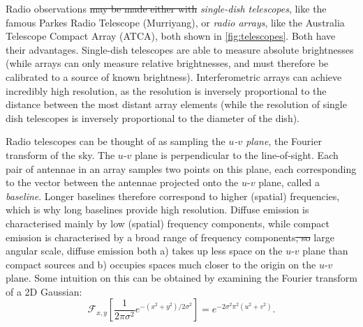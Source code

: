 \documentclass[11pt, a4paper]{book}
\newcommand{\defn}[1]{\emph{#1}}
\providecommand{\DIFaddtex}[1]{{\protect\color{blue}\uwave{#1}}} %
\providecommand{\DIFdeltex}[1]{{\protect\color{red}\sout{#1}}}                      %
\providecommand{\DIFaddbegin}{} %
\providecommand{\DIFaddend}{} %
\providecommand{\DIFdelbegin}{} %
\providecommand{\DIFdelend}{} %
\providecommand{\DIFadd}[1]{\texorpdfstring{\DIFaddtex{#1}}{#1}} %
\providecommand{\DIFdel}[1]{\texorpdfstring{\DIFdeltex{#1}}{}} %
\newcommand{\DIFscaledelfig}{0.5}
\newlength{\DIFdelgraphicswidth} %
\newlength{\DIFdelgraphicsheight} %
\newcommand{\DIFaddincludegraphics}[2][]{{\color{blue}\fbox{\DIFOincludegraphics[#1]{#2}}}} %
\newcommand{\DIFdelincludegraphics}[2][]{%
\sbox{\DIFdelgraphicsbox}{\DIFOincludegraphics[#1]{#2}}%
\settoboxwidth{\DIFdelgraphicswidth}{\DIFdelgraphicsbox} %
\settoboxtotalheight{\DIFdelgraphicsheight}{\DIFdelgraphicsbox} %
\scalebox{\DIFscaledelfig}{%
\parbox[b]{\DIFdelgraphicswidth}{\usebox{\DIFdelgraphicsbox}\\[-\baselineskip] \rule{\DIFdelgraphicswidth}{0em}}\llap{\resizebox{\DIFdelgraphicswidth}{\DIFdelgraphicsheight}{%
\setlength{\unitlength}{\DIFdelgraphicswidth}%
\begin{picture}(1,1)%
\thicklines\linethickness{2pt} %
{\color[rgb]{1,0,0}\put(0,0){\framebox(1,1){}}}%
{\color[rgb]{1,0,0}\put(0,0){\line( 1,1){1}}}%
{\color[rgb]{1,0,0}\put(0,1){\line(1,-1){1}}}%
\end{picture}%
}\hspace*{3pt}}} %
} %
\DeclareRobustCommand{\DIFaddbegin}{\DIFOaddbegin \let\includegraphics\DIFaddincludegraphics} %
\DeclareRobustCommand{\DIFaddend}{\DIFOaddend \let\includegraphics\DIFOincludegraphics} %
\DeclareRobustCommand{\DIFdelbegin}{\DIFOdelbegin \let\includegraphics\DIFdelincludegraphics} %
\DeclareRobustCommand{\DIFdelend}{\DIFOaddend \let\includegraphics\DIFOincludegraphics} %
\begin{document}
        Radio observations \DIFdelbegin \DIFdel{may be made either with }\DIFdelend \DIFaddbegin \DIFadd{are made with either }\DIFaddend \defn{single-dish telescopes}, like the famous Parkes Radio Telescope (Murriyang), or \defn{radio arrays}, like the Australia Telescope Compact Array (ATCA), both shown in \autoref{fig:telescopes}. Both have their advantages. Single-dish telescopes are able to measure absolute brightnesses (while arrays can only measure relative brightnesses, and must therefore be calibrated to a source of known brightness). Interferometric arrays can achieve incredibly high resolution, as the resolution is inversely proportional to the distance between the most distant array elements (while the resolution of single dish telescopes is inversely proportional to the diameter of the dish).

        Radio telescopes can be thought of as sampling the \defn{$u$-$v$ plane}, the Fourier transform of the sky. The $u$-$v$ plane is perpendicular to the line-of-sight. Each pair of antennae in an array samples two points on this plane, each corresponding to the vector between the antennae projected onto the $u$-$v$ plane, called a \defn{baseline}. Longer baselines therefore correspond to higher (spatial) frequencies, which is why long baselines provide high resolution. Diffuse emission is characterised mainly by low (spatial) frequency components, while compact emission is characterised by a broad range of frequency components\DIFdelbegin \DIFdel{, so }\DIFdelend \DIFaddbegin \DIFadd{. This means that }\DIFaddend large angular scale, diffuse emission both a) takes up less space on the $u$-$v$ plane than compact sources and b) occupies spaces much closer to the origin on the $u$-$v$ plane. Some intuition on this can be obtained by examining the Fourier transform of a 2D Gaussian:
        \begin{equation}
            \mathcal F_{x, y}\left[\frac{1}{2\pi\sigma^2} e^{-(x^2 + y^2) / 2\sigma^2}\right] = e^{-2\sigma^2 \pi^2(u^2 + v^2)}.
        \end{equation}
\end{document}
